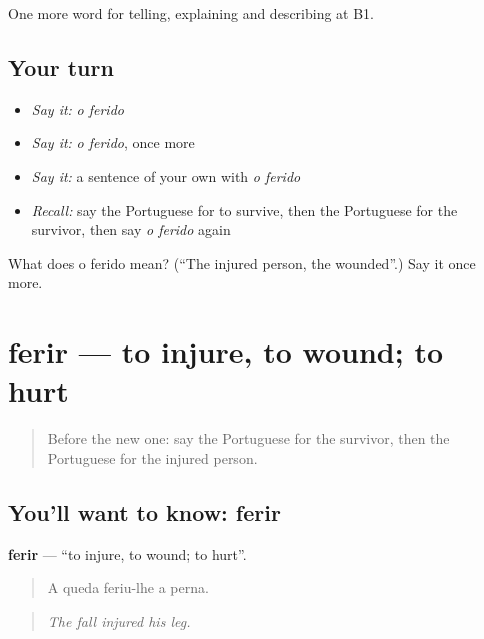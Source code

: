 \begin{grammarlens}[title={What you've built}]
One more word for telling, explaining and describing at B1.
\end{grammarlens}

\subsection*{Your turn}
\begin{itemize}
\raggedright
  \item \emph{Say it:} \emph{o ferido}
  \item \emph{Say it:} \emph{o ferido}, once more
  \item \emph{Say it:} a sentence of your own with \emph{o ferido}
  \item \emph{Recall:} say the Portuguese for to survive, then the Portuguese for the survivor, then say \emph{o ferido} again
\end{itemize}

\begin{tcolorbox}[breakable,colback=teal!4,colframe=teal!35!black,title={Before you move on}]
What does o ferido mean? (\textquotedblleft{}The injured person, the wounded\textquotedblright{}.) Say it once more.
\end{tcolorbox}
\section[ferir]{ferir — to injure, to wound; to hurt}

\label{lesson:PT-C307-ferir}



\begin{quote}
Before the new one: say the Portuguese for the survivor, then the Portuguese for the injured person.
\end{quote}

\subsection*{You'll want to know: ferir}
\textbf{ferir} — \textquotedblleft{}to injure, to wound; to hurt\textquotedblright{}.

\begin{quote}
A queda feriu-lhe a perna.
\end{quote}

\begin{quote}
\emph{The fall injured his leg.}
\end{quote}


